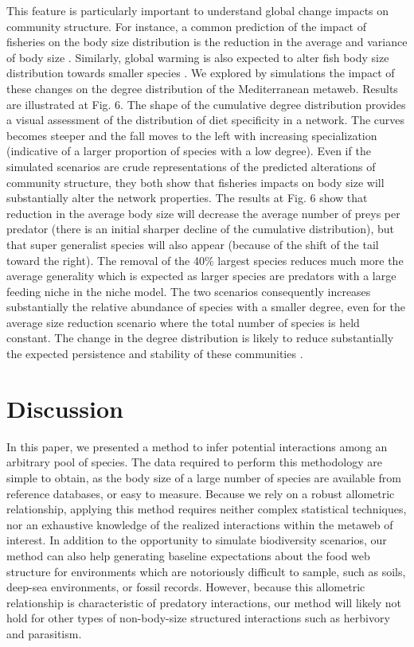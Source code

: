 \documentclass[12pt]{article}
\begin{document}
This feature is particularly important to understand global change impacts on community structure. For instance, a common prediction of the impact of fisheries on the body size distribution is the reduction in the average and variance of body size \parencite{Jackson2001}. Similarly, global warming is also expected to alter fish body size distribution towards smaller species \parencite{Cheung2012}. We explored by simulations the impact of these changes on the degree distribution of the Mediterranean metaweb. Results are illustrated at Fig. 6. The shape of the cumulative degree distribution provides a visual assessment of the distribution of diet specificity in a network. The curves becomes steeper and the fall moves to the left with increasing specialization (indicative of a larger proportion of species with a low degree). Even if the simulated scenarios are crude representations of the predicted alterations of community structure, they both show that fisheries impacts on body size will substantially alter the network properties. The results at Fig. 6 show that reduction in the average body size will decrease the average number of preys per predator (there is an initial sharper decline of the cumulative distribution), but that super generalist species will also appear (because of the shift of the tail toward the right). The removal of the 40\% largest species reduces much more the average generality which is expected as larger species are predators with a large feeding niche in the niche model. The two scenarios consequently increases substantially the relative abundance of species with a smaller degree, even for the average size reduction scenario where the total number of species is held constant. The change in the degree distribution is likely to reduce substantially the expected persistence and stability of these communities \parencite{Gravel2011a, Gravel2011b}.

\section{Discussion}

In this paper, we presented a method to infer potential interactions among an arbitrary pool of species. The data required to perform this methodology are simple to obtain, as the body size of a large number of species are available from reference databases, or easy to measure. Because we rely on a robust allometric relationship, applying this method requires neither complex statistical techniques, nor an exhaustive knowledge of the realized interactions within the metaweb of interest. In addition to the opportunity to simulate biodiversity scenarios, our method can also help generating baseline expectations about the food web structure for environments which are notoriously difficult to sample, such as soils, deep-sea environments, or fossil records. However, because this allometric relationship is characteristic of predatory interactions, our method will likely not hold for other types of non-body-size structured interactions such as herbivory and parasitism.
\end{document}
